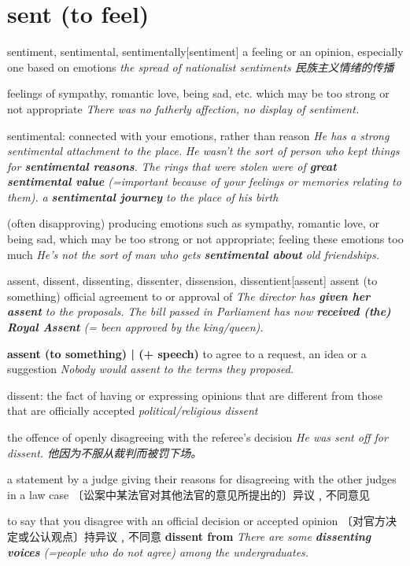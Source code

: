 \section{sent (to feel)}

\begin{DefWord}{sentiment, sentimental, sentimentally}[sentiment]
    a feeling or an opinion, especially one based on emotions
    \textit{the spread of nationalist sentiments 民族主义情绪的传播}

    feelings of sympathy, romantic love, being sad, etc. which may be too strong or not appropriate
    \textit{There was no fatherly affection, no display of sentiment.}

    sentimental: connected with your emotions, rather than reason
    \textit{He has a strong sentimental attachment to the place.}
    \textit{He wasn't the sort of person who kept things for \textbf{sentimental reasons}.}
    \textit{The rings that were stolen were of \textbf{great sentimental value} (=important because of your feelings or memories relating to them).}
    \textit{a \textbf{sentimental journey} to the place of his birth}

    (often disapproving) producing emotions such as sympathy, romantic love, or being sad, which may be too strong or not appropriate; feeling these emotions too much
    \textit{He's not the sort of man who gets \textbf{sentimental about} old friendships.}
\end{DefWord}

\begin{DefWord}{assent, dissent, dissenting, dissenter, dissension, dissentient}[assent]
    assent (to something) official agreement to or approval of 
    \textit{The director has \textbf{given her assent} to the proposals.}
    \textit{The bill passed in Parliament has now \textbf{received (the) Royal Assent} (= been approved by the king/queen).}

    \textbf{assent (to something) | (+ speech)} to agree to a request, an idea or a suggestion
    \textit{Nobody would assent to the terms they proposed.}

    dissent: the fact of having or expressing opinions that are different from those that are officially accepted
    \textit{political/religious dissent}

    the offence of openly disagreeing with the referee's decision
    \textit{He was sent off for dissent. 他因为不服从裁判而被罚下场。}

    a statement by a judge giving their reasons for disagreeing with the other judges in a law case 〔讼案中某法官对其他法官的意见所提出的〕异议﹐不同意见

    to say that you disagree with an official decision or accepted opinion  〔对官方决定或公认观点〕持异议﹐不同意
    \textbf{dissent from} \textit{There are some \textbf{dissenting voices} (=people who do not agree) among the undergraduates.}
\end{DefWord}

